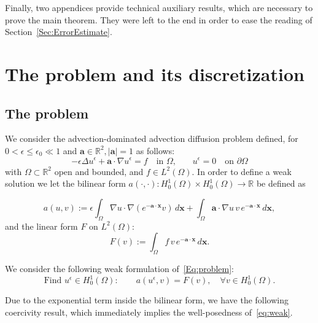 \documentclass{article}
\newcommand{\R}{\ensuremath{\mathbb{R}}\xspace}
\newcommand{\aaa}{\ensuremath{\mathbf{a}}\xspace}
\newcommand{\xxx}{\ensuremath{\mathbf{x}}\xspace}
\newcommand{\Hoi}[1][\Omega]{\ensuremath{H_0^1(#1)}\xspace}
\newcommand{\rz}{\mathbb{R}}
\newcommand{\ueps}{u^\epsilon}
\begin{document}
Finally, two appendices provide technical auxiliary results, which are necessary to prove the main theorem. 
They were left to the end in order to ease the reading of Section~\ref{Sec:ErrorEstimate}.


\section{The problem and its discretization}\label{Sec:problem}
\subsection{The problem}
We consider the advection-dominated advection diffusion problem defined, for $0< \epsilon \le \epsilon_0 \ll 1$
 and $\aaa\in \R^2, |\aaa|=1$ as follows:
\begin{equation}\label{Eq:problem}
    - \epsilon \Delta u^\epsilon + \aaa \cdot \nabla  u^\epsilon =f \quad \text{in $\Omega$,}\qquad
        u^\epsilon = 0 \quad \text{on $\partial\Omega$}
\end{equation}
with $\Omega\subset \R^2$ open and bounded, and $f \in L^2(\Omega)$.
In order to define a weak solution we let the bilinear form $a(\cdot,\cdot): \Hoi \times \Hoi \rightarrow \rz$ be defined as

\begin{equation*}
a(u,v) := \epsilon\int_\Omega \nabla u \cdot \nabla(e^{-\aaa\cdot \xxx} v) \, d\xxx + \int_\Omega \aaa \cdot \nabla u\, v \,e^{-\aaa\cdot \xxx} \,d\xxx,
\end{equation*}
and the linear form $F$ on $L^2(\Omega)$:
\begin{equation*}
F(v) := \int_\Omega f\, v\, e^{-\aaa\cdot \xxx} \, d\xxx.
\end{equation*}

We consider the following weak formulation of~\eqref{Eq:problem}:
\begin{equation}\label{eq:weak}
\text{Find } \ueps \in \Hoi : \qquad a(\ueps,v) = F(v), \quad \forall v\in\Hoi.
\end{equation}

Due to the exponential term inside the bilinear form, we have the following coercivity result, which immediately implies the well-posedness of~\eqref{eq:weak}.
\end{document}
